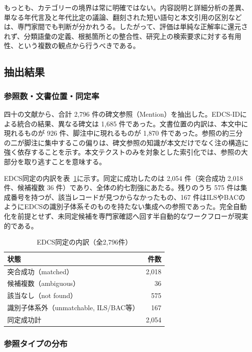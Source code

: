 もっとも、カテゴリーの境界は常に明確ではない。内容説明と詳細分析の差異、単なる年代言及と年代比定の議論、翻刻された短い語句と本文引用の区別などは、専門家間でも判断が分かれうる。したがって、評価は単純な正解率に還元されず、分類語彙の定義、根拠箇所との整合性、研究上の検索要求に対する有用性、という複数の観点から行うべきである。

\subsection{抽出結果}

\subsubsection{参照数・文書位置・同定率}

四十の文献から、合計 2,796 件の碑文参照（Mention）を抽出した。EDCS-IDによる統合の結果、異なる碑文は 1,685 件であった。文書位置の内訳は、本文中に現れるものが 926 件、脚注中に現れるものが 1,870 件であった。参照の約三分の二が脚注に集中するこの偏りは、碑文参照の知識が本文だけでなく注の構造に強く依存することを示す。本文テクストのみを対象とした索引化では、参照の大部分を取り逃すことを意味する。

EDCS同定の内訳を表~\ref{tab:ch5-edcs}に示す。同定に成功したのは 2,054 件（突合成功 2,018 件、候補複数 36 件）であり、全体の約七割強にあたる。残りのうち 575 件は集成番号を持つが、該当レコードが見つからなかったもの、167 件はILSやBACのようにEDCSの識別子体系そのものを持たない集成への参照であった。完全自動化を前提とせず、未同定候補を専門家確認へ回す半自動的なワークフローが現実的である。

\begin{table}[htbp]
  \centering
  \caption{EDCS同定の内訳（全2,796件）}
  \label{tab:ch5-edcs}
  \begin{tabular}{lr}
    \hline
    状態 & 件数 \\
    \hline
    突合成功（matched） & 2,018 \\
    候補複数（ambiguous） & 36 \\
    該当なし（not found） & 575 \\
    識別子体系外（unmatchable, ILS/BAC等） & 167 \\
    \hline
    同定成功計 & 2,054 \\
    \hline
  \end{tabular}
\end{table}

\subsubsection{参照タイプの分布}

